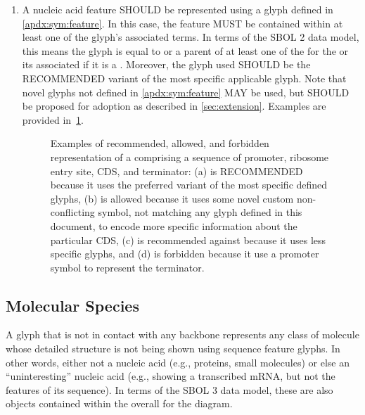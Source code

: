 \begin{enumerate}
\item A nucleic acid feature SHOULD be represented using a glyph defined in \ref{apdx:sym:feature}.  In this case, the feature MUST be contained within at least one of the glyph's associated terms.
In terms of the SBOL 2 data model, this means the glyph is equal to or a parent of at least one of the  for the  or its associated  if it is a .
	Moreover, the glyph used SHOULD be the RECOMMENDED variant of the most specific applicable glyph.  Note that novel glyphs not defined in \ref{apdx:sym:feature} MAY be used, but SHOULD be proposed for adoption as described in \ref{sec:extension}.
	Examples are provided in~\ref{exa:2f}.
	\begin{figure}[h!]
	\centering
	\caption{Examples of recommended, allowed, and forbidden representation of a  comprising a sequence of promoter, ribosome entry site, CDS, and terminator: (a) is RECOMMENDED because it uses the preferred variant of the most specific defined glyphs, (b) is allowed because it uses some novel custom non-conflicting symbol, not matching any glyph defined in this document, to encode more specific information about the particular CDS, (c) is recommended against because it uses less specific glyphs, and (d) is forbidden because it use a promoter symbol to represent the terminator.}
	\label{exa:2f}
	\end{figure}
\end{enumerate}


\subsection{Molecular Species}

A glyph that is not in contact with any backbone represents any class of molecule whose detailed structure is not being shown using sequence feature glyphs.
In other words, either not a nucleic acid (e.g., proteins, small molecules) or else an ``uninteresting'' nucleic acid (e.g., showing a transcribed mRNA, but not the features of its sequence).
In terms of the SBOL 3 data model, these are also  objects contained within the overall  for the diagram.

